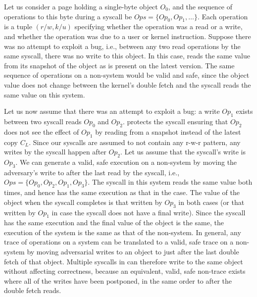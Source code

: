 \documentclass[letterpaper,twocolumn,10pt]{article}
\begin{document}
Let us consider a page holding a single-byte object $O_0$, and the 
sequence of operations to this byte during a \midas syscall be 
$Ops = \{Op_0, Op_1, \dots \}$. 
Each operation is a tuple $(r/w, k/u)$ specifying whether the 
operation was a read or a write, and whether the operation was due to 
a user or kernel instruction.
Suppose there was no attempt to exploit a \tocttou bug, i.e., between
any two read operations by the same syscall, there was no write to 
this object.
In this case, \midas reads the same value from its snapshot of the 
object as is present on the latest version. 
The same sequence of operations on a non-\midas system would be valid and
safe, since the object value does not change between the kernel's double 
fetch and the syscall reads the same value on this system.

Let us now
%
assume that there was an attempt to exploit a \tocttou bug:
a write $Op_1$ exists between two syscall reads $Op_0$ and $Op_2$.
\midas protects the syscall ensuring that $Op_2$ does not see the 
effect of $Op_1$ by reading from a snapshot instead of the latest 
copy $C_L$. 
Since our syscalls are assumed to not contain any r-w-r pattern, 
any writes by the syscall happen after $Op_2$.
Let us assume that the syscall's write is $Op_3$.
We can generate a valid, safe execution on a non-\midas system 
by moving the adversary's write to after the last read by the 
syscall, i.e., $Ops = \{Op_0, Op_2, Op_1, Op_3\}$.
The syscall in this system reads the same value both times, and 
hence has the same execution as that in the \midas case.
The value of the object when the syscall completes is that 
written by $Op_3$ in both cases (or that written by $Op_1$ in 
case the syscall does not have a final write).
Since the syscall has the same execution and the final value of 
the object is the same, the execution of the \midas system 
is the same as that of the non-\midas system.
In general, any trace of operations on a \midas system can 
be translated  to a valid, safe trace on a non-\midas system 
by moving adversarial writes to an object to just after the last
double fetch of that object.
Multiple syscalls in \midas can therefore write to the same object 
without affecting 
correctness, because an equivalent, valid, safe non-\midas trace 
exists where all of the writes have been postponed, in the same order 
to after the double fetch reads. 
\end{document}
